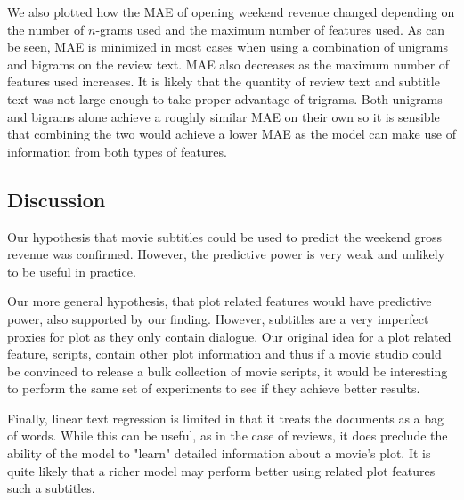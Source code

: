 \documentclass[11pt]{article}
\begin{document}
We also plotted how the MAE of opening weekend revenue changed depending on the number
of $n$-grams used and the maximum number of features used. As can be seen, MAE is minimized
in most cases when using a combination of unigrams and bigrams on the review text. MAE
also decreases as the maximum number of features used increases. It is likely that the
quantity of review text and subtitle text was not large enough to take proper advantage
of trigrams. Both unigrams and bigrams alone achieve a roughly similar MAE on their own
so it is sensible that combining the two would achieve a lower MAE as the model can make
use of information from both types of features.

\subsection{Discussion}
Our hypothesis that movie subtitles could be used to predict the weekend gross revenue
was confirmed. However, the predictive power is very weak and unlikely to be useful in practice. 

Our more general hypothesis, that plot related features would have predictive power,
also supported by our finding.  However, subtitles are a very imperfect proxies for plot
as they only contain dialogue. Our original idea for a plot related feature, scripts,
contain other plot information and thus if a movie studio could be convinced to release a
bulk collection of movie scripts, it would be interesting to perform the same set of
experiments to see if they achieve better results.

Finally, linear text regression is limited in that it treats the documents as a bag of
words. While this can be useful, as in the case of reviews, it does preclude the ability
of the model to "learn" detailed information about a movie's plot. It is quite likely that
a richer model may perform better using related plot features such a subtitles.
\end{document}
